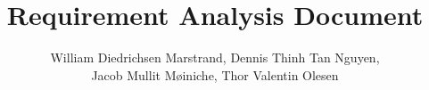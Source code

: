 \documentclass[]{article}
\title{Requirement Analysis Document}
\author{William Diedrichsen Marstrand, Dennis Thinh Tan Nguyen, \\Jacob Mullit Møiniche, Thor Valentin Olesen}
\begin{document}
\maketitle





\


\end{document}
